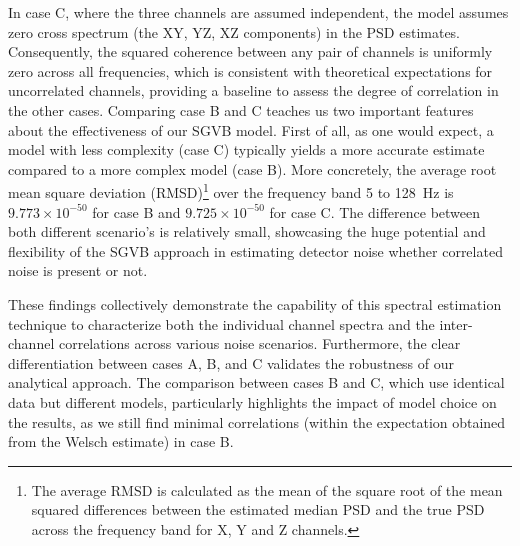 \documentclass[%
 reprint,
 amsmath,amssymb,
 aps,
 nofootinbib,
]{revtex4-2}
\begin{document}

In case C, where the three channels are assumed independent, the model assumes zero cross spectrum (the XY, YZ, XZ components) in the PSD estimates.  Consequently, the squared coherence between any pair of channels is uniformly zero across all frequencies, which is consistent with theoretical expectations for uncorrelated channels, providing a baseline to assess the degree of correlation in the other cases.
Comparing case B and C teaches us two important features about the effectiveness of our SGVB model. First of all, as one would expect, a model with less complexity (case C) typically yields a more accurate estimate compared to a more complex model (case B). More concretely, the average root mean square deviation (RMSD)\footnote{The average RMSD is calculated as the mean of the square root of the mean squared differences between the estimated median PSD and the true PSD across the frequency band for X, Y and Z channels.} over the frequency band 5 to \SI{128}{Hz}  is $9.773 \times 10^{-50}$ for case B and $9.725 \times 10^{-50}$ for case C. The difference between both different scenario's is relatively small, showcasing the huge potential and flexibility of the SGVB approach in estimating detector noise whether correlated noise is present or not.


These findings collectively demonstrate the capability of this spectral estimation technique to characterize both the individual channel spectra and the inter-channel correlations across various noise scenarios.
Furthermore, the clear differentiation between cases A, B, and C validates the robustness of our analytical approach. The comparison between cases B and C, which use identical data but different models, particularly highlights the impact of model choice on the results, as we still find minimal correlations (within the expectation obtained from the Welsch estimate) in case B. 
\end{document}
